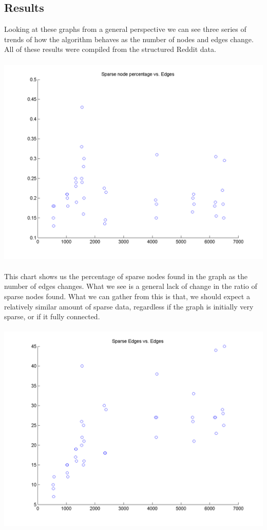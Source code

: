\documentclass{article}
\begin{document}
\subsection{Results}
Looking at these graphs from a general perspective we can see three series of trends of how the algorithm behaves as the number of nodes and edges change. All of these results were compiled from the structured Reddit data.
\\\\
\includegraphics[scale=0.5]{imgs/charts/sparse_node_vs_edges.png}
\\\\
This chart shows us the percentage of sparse nodes found in the graph as the number of edges changes. What we see is a general lack of change in the ratio of sparse nodes found. What we can gather from this is that, we should expect a relatively similar amount of sparse data, regardless if the graph is initially very sparse, or if it fully connected.
\\\\
\includegraphics[scale=0.5]{imgs/charts/sparse_edges_vs_edges.png}
\end{document}
